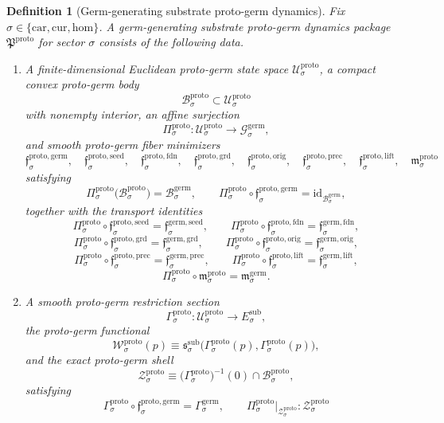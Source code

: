 \documentclass[11pt]{article}
\newcommand{\Car}{\mathrm{car}}
\newcommand{\Cur}{\mathrm{cur}}
\newcommand{\Hom}{\mathrm{hom}}
\newcommand{\SubTarget}[1]{E_{#1}^{\mathrm{sub}}}
\newcommand{\SubPair}[1]{\mathfrak s_{#1}^{\mathrm{sub}}}
\newcommand{\GermSpace}[1]{\mathcal G_{#1}^{\mathrm{germ}}}
\newcommand{\GermBody}[1]{\mathcal B_{#1}^{\mathrm{germ}}}
\newcommand{\GermSeedMin}[1]{\mathfrak f_{#1}^{\mathrm{germ,seed}}}
\newcommand{\GermFoundMin}[1]{\mathfrak f_{#1}^{\mathrm{germ,fdn}}}
\newcommand{\GermGroundMin}[1]{\mathfrak f_{#1}^{\mathrm{germ,grd}}}
\newcommand{\GermOrigMin}[1]{\mathfrak f_{#1}^{\mathrm{germ,orig}}}
\newcommand{\GermPrecMin}[1]{\mathfrak f_{#1}^{\mathrm{germ,prec}}}
\newcommand{\GermLiftMin}[1]{\mathfrak f_{#1}^{\mathrm{germ,lift}}}
\newcommand{\GermSubMin}[1]{\mathfrak m_{#1}^{\mathrm{germ}}}
\newcommand{\GermSection}[1]{\Gamma_{#1}^{\mathrm{germ}}}
\newcommand{\ProtoPackage}{\mathfrak P^{\mathrm{proto}}}
\newcommand{\ProtoSpace}[1]{\mathcal U_{#1}^{\mathrm{proto}}}
\newcommand{\ProtoBody}[1]{\mathcal B_{#1}^{\mathrm{proto}}}
\newcommand{\ProtoProj}[1]{\Pi_{#1}^{\mathrm{proto}}}
\newcommand{\ProtoGermMin}[1]{\mathfrak f_{#1}^{\mathrm{proto,germ}}}
\newcommand{\ProtoSeedMin}[1]{\mathfrak f_{#1}^{\mathrm{proto,seed}}}
\newcommand{\ProtoFoundMin}[1]{\mathfrak f_{#1}^{\mathrm{proto,fdn}}}
\newcommand{\ProtoGroundMin}[1]{\mathfrak f_{#1}^{\mathrm{proto,grd}}}
\newcommand{\ProtoOrigMin}[1]{\mathfrak f_{#1}^{\mathrm{proto,orig}}}
\newcommand{\ProtoPrecMin}[1]{\mathfrak f_{#1}^{\mathrm{proto,prec}}}
\newcommand{\ProtoLiftMin}[1]{\mathfrak f_{#1}^{\mathrm{proto,lift}}}
\newcommand{\ProtoSubMin}[1]{\mathfrak m_{#1}^{\mathrm{proto}}}
\newcommand{\ProtoSection}[1]{\Gamma_{#1}^{\mathrm{proto}}}
\newcommand{\ProtoFunctional}[1]{\mathscr W_{#1}^{\mathrm{proto}}}
\newcommand{\ProtoShellSet}[1]{\mathcal Z_{#1}^{\mathrm{proto}}}
\newtheorem{definition}{Definition}
\begin{document}
\begin{definition}[Germ-generating substrate proto-germ dynamics]
\label{def:proto}
Fix \(\sigma\in\{\Car,\Cur,\Hom\}\). A germ-generating substrate proto-germ dynamics package \(\ProtoPackage\) for sector \(\sigma\) consists of the following data.
\begin{enumerate}
    \item A finite-dimensional Euclidean proto-germ state space \(\ProtoSpace{\sigma}\), a compact convex proto-germ body
    \[
    \ProtoBody{\sigma}\subset\ProtoSpace{\sigma}
    \]
    with nonempty interior, an affine surjection
    \[
    \ProtoProj{\sigma}:\ProtoSpace{\sigma}\to\GermSpace{\sigma},
    \]
    and smooth proto-germ fiber minimizers
    \[
    \ProtoGermMin{\sigma},\quad
    \ProtoSeedMin{\sigma},\quad
    \ProtoFoundMin{\sigma},\quad
    \ProtoGroundMin{\sigma},\quad
    \ProtoOrigMin{\sigma},\quad
    \ProtoPrecMin{\sigma},\quad
    \ProtoLiftMin{\sigma},\quad
    \ProtoSubMin{\sigma}
    \]
    satisfying
    \[
    \ProtoProj{\sigma}\bigl(\ProtoBody{\sigma}\bigr)=\GermBody{\sigma},
    \qquad
    \ProtoProj{\sigma}\circ\ProtoGermMin{\sigma}
    =
    \mathrm{id}_{\GermBody{\sigma}},
    \]
    together with the transport identities
    \[
    \ProtoProj{\sigma}\circ\ProtoSeedMin{\sigma}
    =
    \GermSeedMin{\sigma},
    \qquad
    \ProtoProj{\sigma}\circ\ProtoFoundMin{\sigma}
    =
    \GermFoundMin{\sigma},
    \]
    \[
    \ProtoProj{\sigma}\circ\ProtoGroundMin{\sigma}
    =
    \GermGroundMin{\sigma},
    \qquad
    \ProtoProj{\sigma}\circ\ProtoOrigMin{\sigma}
    =
    \GermOrigMin{\sigma},
    \]
    \[
    \ProtoProj{\sigma}\circ\ProtoPrecMin{\sigma}
    =
    \GermPrecMin{\sigma},
    \qquad
    \ProtoProj{\sigma}\circ\ProtoLiftMin{\sigma}
    =
    \GermLiftMin{\sigma},
    \]
    \[
    \ProtoProj{\sigma}\circ\ProtoSubMin{\sigma}
    =
    \GermSubMin{\sigma}.
    \]
    \item A smooth proto-germ restriction section
    \[
    \ProtoSection{\sigma}:\ProtoSpace{\sigma}\to\SubTarget{\sigma},
    \]
    the proto-germ functional
    \[
    \ProtoFunctional{\sigma}(p)
    \equiv
    \SubPair{\sigma}\bigl(\ProtoSection{\sigma}(p),\ProtoSection{\sigma}(p)\bigr),
    \]
    and the exact proto-germ shell
    \[
    \ProtoShellSet{\sigma}
    \equiv
    \bigl(\ProtoSection{\sigma}\bigr)^{-1}(0)\cap\ProtoBody{\sigma},
    \]
    satisfying
    \[
    \ProtoSection{\sigma}\circ\ProtoGermMin{\sigma}
    =
    \GermSection{\sigma},
    \qquad
    \ProtoProj{\sigma}\big|_{\ProtoShellSet{\sigma}}
    :
    \ProtoShellSet{\sigma}
\]
\end{enumerate}
\end{definition}
\end{document}
